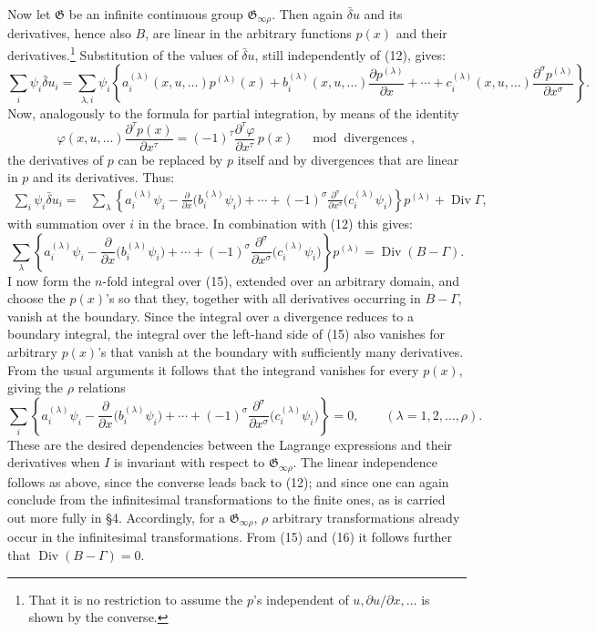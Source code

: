 \documentclass[11pt]{article}
\providecommand{\Div}{\operatorname{Div}}
\providecommand{\G}{\mathfrak G}
\providecommand{\bd}{\bar{\delta}}
\providecommand{\p}{\partial}
\begin{document}
Now let \(\G\) be an infinite continuous group \(\G_{\infty\rho}\). Then again \(\bd u\) and its derivatives, hence also \(B\), are linear in the arbitrary functions \(p(x)\) and their derivatives.\footnote{That it is no restriction to assume the \(p\)'s independent of \(u,\p u/\p x,\ldots\) is shown by the converse.} Substitution of the values of \(\bd u\), still independently of (12), gives:
\[
\sum_i\psi_i\bd u_i
=\sum_{\lambda,i}\psi_i\left\{
a_i^{(\lambda)}(x,u,\ldots)p^{(\lambda)}(x)
+b_i^{(\lambda)}(x,u,\ldots)\frac{\p p^{(\lambda)}}{\p x}
+\cdots+c_i^{(\lambda)}(x,u,\ldots)
\frac{\p^\sigma p^{(\lambda)}}{\p x^\sigma}\right\}.
\]
Now, analogously to the formula for partial integration, by means of the identity
\[
\varphi(x,u,\ldots)\frac{\p^\tau p(x)}{\p x^\tau}
=(-1)^\tau\frac{\p^\tau\varphi}{\p x^\tau}\,p(x)
\quad \bmod \text{ divergences},
\]
the derivatives of \(p\) can be replaced by \(p\) itself and by divergences that are linear in \(p\) and its derivatives. Thus:
\begin{equation}
\begin{aligned}
\sum_i\psi_i\bd u_i
={}&\sum_\lambda\left\{
a_i^{(\lambda)}\psi_i-\frac{\p}{\p x}\bigl(b_i^{(\lambda)}\psi_i\bigr)
+\cdots+(-1)^\sigma
\frac{\p^\sigma}{\p x^\sigma}\bigl(c_i^{(\lambda)}\psi_i\bigr)
\right\}p^{(\lambda)}+\Div\Gamma,
\end{aligned}
\tag{14}
\end{equation}
with summation over \(i\) in the brace. In combination with (12) this gives:
\begin{equation}
\sum_\lambda\left\{
a_i^{(\lambda)}\psi_i-\frac{\p}{\p x}\bigl(b_i^{(\lambda)}\psi_i\bigr)
+\cdots+(-1)^\sigma
\frac{\p^\sigma}{\p x^\sigma}\bigl(c_i^{(\lambda)}\psi_i\bigr)
\right\}p^{(\lambda)}
=\Div(B-\Gamma).
\tag{15}
\end{equation}
I now form the \(n\)-fold integral over (15), extended over an arbitrary domain, and choose the \(p(x)\)'s so that they, together with all derivatives occurring in \(B-\Gamma\), vanish at the boundary. Since the integral over a divergence reduces to a boundary integral, the integral over the left-hand side of (15) also vanishes for arbitrary \(p(x)\)'s that vanish at the boundary with sufficiently many derivatives. From the usual arguments it follows that the integrand vanishes for every \(p(x)\), giving the \(\rho\) relations
\begin{equation}
\sum_i\left\{
a_i^{(\lambda)}\psi_i-\frac{\p}{\p x}\bigl(b_i^{(\lambda)}\psi_i\bigr)
+\cdots+(-1)^\sigma
\frac{\p^\sigma}{\p x^\sigma}\bigl(c_i^{(\lambda)}\psi_i\bigr)
\right\}=0,\qquad(\lambda=1,2,\ldots,\rho).
\tag{16}
\end{equation}
These are the desired dependencies between the Lagrange expressions and their derivatives when \(I\) is invariant with respect to \(\G_{\infty\rho}\). The linear independence follows as above, since the converse leads back to (12); and since one can again conclude from the infinitesimal transformations to the finite ones, as is carried out more fully in \S{}4. Accordingly, for a \(\G_{\infty\rho}\), \(\rho\) arbitrary transformations already occur in the infinitesimal transformations. From (15) and (16) it follows further that \(\Div(B-\Gamma)=0\).
\end{document}
